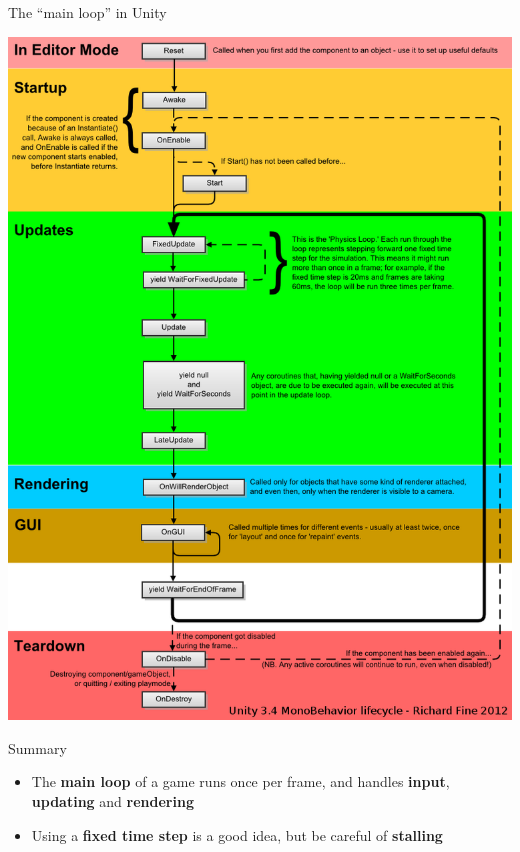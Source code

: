 \begin{frame}{The ``main loop'' in Unity}
    \begin{center}
        \includegraphics[height=0.8\textheight]{unity-lifetime}
    \end{center}
\end{frame}

\begin{frame}{Summary}
    \begin{itemize}
        \item The \textbf{main loop} of a game runs once per frame,
            and handles \textbf{input}, \textbf{updating} and \textbf{rendering}
        \item Using a \textbf{fixed time step} is a good idea, but be careful of \textbf{stalling}
    \end{itemize}
\end{frame}

